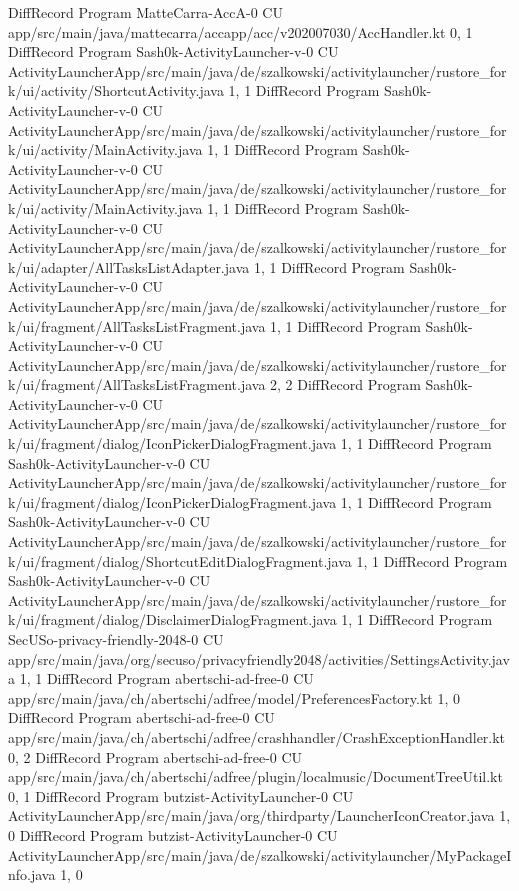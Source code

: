 DiffRecord Program MatteCarra-AccA-0 CU app/src/main/java/mattecarra/accapp/acc/v202007030/AccHandler.kt  {0, 1}
DiffRecord Program Sash0k-ActivityLauncher-v-0 CU ActivityLauncherApp/src/main/java/de/szalkowski/activitylauncher/rustore_fork/ui/activity/ShortcutActivity.java  {1, 1}
DiffRecord Program Sash0k-ActivityLauncher-v-0 CU ActivityLauncherApp/src/main/java/de/szalkowski/activitylauncher/rustore_fork/ui/activity/MainActivity.java  {1, 1}
DiffRecord Program Sash0k-ActivityLauncher-v-0 CU ActivityLauncherApp/src/main/java/de/szalkowski/activitylauncher/rustore_fork/ui/activity/MainActivity.java  {1, 1}
DiffRecord Program Sash0k-ActivityLauncher-v-0 CU ActivityLauncherApp/src/main/java/de/szalkowski/activitylauncher/rustore_fork/ui/adapter/AllTasksListAdapter.java  {1, 1}
DiffRecord Program Sash0k-ActivityLauncher-v-0 CU ActivityLauncherApp/src/main/java/de/szalkowski/activitylauncher/rustore_fork/ui/fragment/AllTasksListFragment.java  {1, 1}
DiffRecord Program Sash0k-ActivityLauncher-v-0 CU ActivityLauncherApp/src/main/java/de/szalkowski/activitylauncher/rustore_fork/ui/fragment/AllTasksListFragment.java  {2, 2}
DiffRecord Program Sash0k-ActivityLauncher-v-0 CU ActivityLauncherApp/src/main/java/de/szalkowski/activitylauncher/rustore_fork/ui/fragment/dialog/IconPickerDialogFragment.java  {1, 1}
DiffRecord Program Sash0k-ActivityLauncher-v-0 CU ActivityLauncherApp/src/main/java/de/szalkowski/activitylauncher/rustore_fork/ui/fragment/dialog/IconPickerDialogFragment.java  {1, 1}
DiffRecord Program Sash0k-ActivityLauncher-v-0 CU ActivityLauncherApp/src/main/java/de/szalkowski/activitylauncher/rustore_fork/ui/fragment/dialog/ShortcutEditDialogFragment.java  {1, 1}
DiffRecord Program Sash0k-ActivityLauncher-v-0 CU ActivityLauncherApp/src/main/java/de/szalkowski/activitylauncher/rustore_fork/ui/fragment/dialog/DisclaimerDialogFragment.java  {1, 1}
DiffRecord Program SecUSo-privacy-friendly-2048-0 CU app/src/main/java/org/secuso/privacyfriendly2048/activities/SettingsActivity.java  {1, 1}
DiffRecord Program abertschi-ad-free-0 CU app/src/main/java/ch/abertschi/adfree/model/PreferencesFactory.kt  {1, 0}
DiffRecord Program abertschi-ad-free-0 CU app/src/main/java/ch/abertschi/adfree/crashhandler/CrashExceptionHandler.kt  {0, 2}
DiffRecord Program abertschi-ad-free-0 CU app/src/main/java/ch/abertschi/adfree/plugin/localmusic/DocumentTreeUtil.kt  {0, 1}
DiffRecord Program butzist-ActivityLauncher-0 CU ActivityLauncherApp/src/main/java/org/thirdparty/LauncherIconCreator.java  {1, 0}
DiffRecord Program butzist-ActivityLauncher-0 CU ActivityLauncherApp/src/main/java/de/szalkowski/activitylauncher/MyPackageInfo.java  {1, 0}

